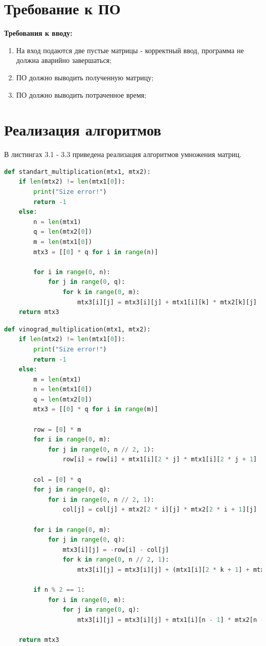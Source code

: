 \documentclass[12pt]{report}
\begin{document}
\section{Требование к ПО}
\textbf{Требования к вводу:}
\begin{enumerate}
	\item На вход подаются две пустые матрицы - корректный ввод, программа не должна аварийно завершаться;
	\item ПО должно выводить полученную матрицу;
	\item ПО должно выводить потраченное время;
\end{enumerate}

\section{Реализация алгоритмов}

В листингах 3.1 - 3.3 приведена реализация алгоритмов умножения матриц.

\begin{lstlisting}[label=some-code,caption=Функция классического умножения матриц,language=Python]
def standart_multiplication(mtx1, mtx2):
	if len(mtx2) != len(mtx1[0]):
		print("Size error!")
		return -1
	else:
		n = len(mtx1)
		q = len(mtx2[0])
		m = len(mtx1[0])
		mtx3 = [[0] * q for i in range(n)]
	
		for i in range(0, n):
			for j in range(0, q):
				for k in range(0, m):
					mtx3[i][j] = mtx3[i][j] + mtx1[i][k] * mtx2[k][j]
	return mtx3
\end{lstlisting}

\begin{lstlisting}[label=some-code,caption=Функция умножения матриц с помощью аглоритма Винограда,language=Python]
def vinograd_multiplication(mtx1, mtx2):
	if len(mtx2) != len(mtx1[0]):
		print("Size error!")
		return -1
	else:
		m = len(mtx1)
		n = len(mtx1[0])
		q = len(mtx2[0])
		mtx3 = [[0] * q for i in range(m)]
		
		row = [0] * m
		for i in range(0, m):
			for j in range(0, n // 2, 1):
				row[i] = row[i] + mtx1[i][2 * j] * mtx1[i][2 * j + 1]
		
		col = [0] * q
		for j in range(0, q):
			for i in range(0, n // 2, 1):
				col[j] = col[j] + mtx2[2 * i][j] * mtx2[2 * i + 1][j]
		
		for i in range(0, m):
			for j in range(0, q):
				mtx3[i][j] = -row[i] - col[j]
				for k in range(0, n // 2, 1):
					mtx3[i][j] = mtx3[i][j] + (mtx1[i][2 * k + 1] + mtx2[2 * k][j]) * (mtx1[i][2 * k] + mtx2[2 * k + 1][j])
		
		if n % 2 == 1:
			for i in range(0, m):
				for j in range(0, q):
					mtx3[i][j] = mtx3[i][j] + mtx1[i][n - 1] * mtx2[n - 1][j]
		
	return mtx3
\end{lstlisting}
\end{document}
